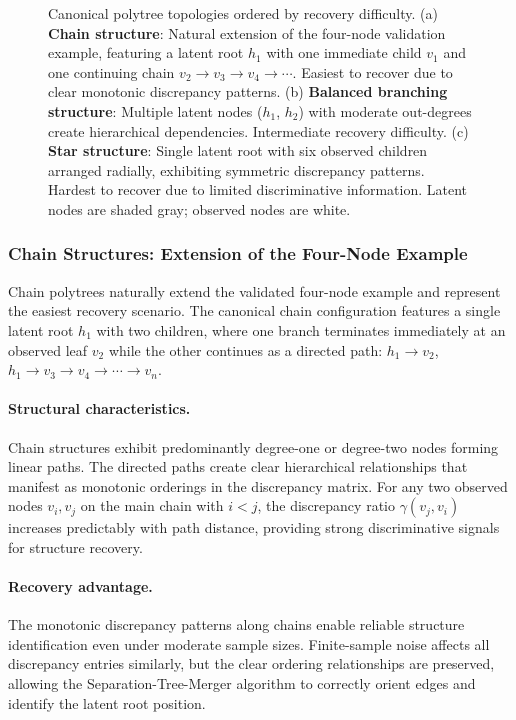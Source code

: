 \documentclass[11pt,a4paper]{article}
\numberwithin{equation}{section}
\begin{document}
\begin{figure}[ht]
\caption{Canonical polytree topologies ordered by recovery difficulty. (a) \textbf{Chain structure}: Natural extension of the four-node validation example, featuring a latent root $h_1$ with one immediate child $v_1$ and one continuing chain $v_2 \to v_3 \to v_4 \to \cdots$. Easiest to recover due to clear monotonic discrepancy patterns. (b) \textbf{Balanced branching structure}: Multiple latent nodes ($h_1$, $h_2$) with moderate out-degrees create hierarchical dependencies. Intermediate recovery difficulty. (c) \textbf{Star structure}: Single latent root with six observed children arranged radially, exhibiting symmetric discrepancy patterns. Hardest to recover due to limited discriminative information. Latent nodes are shaded gray; observed nodes are white.}
\label{fig:topology_examples}
\end{figure}

\subsubsection{Chain Structures: Extension of the Four-Node Example}

Chain polytrees naturally extend the validated four-node example and represent the easiest recovery scenario. The canonical chain configuration features a single latent root $h_1$ with two children, where one branch terminates immediately at an observed leaf $v_2$ while the other continues as a directed path: $h_1 \to v_2$, $h_1 \to v_3 \to v_4 \to \cdots \to v_n$. 

\paragraph{Structural characteristics.} Chain structures exhibit predominantly degree-one or degree-two nodes forming linear paths. The directed paths create clear hierarchical relationships that manifest as monotonic orderings in the discrepancy matrix. For any two observed nodes $v_i, v_j$ on the main chain with $i < j$, the discrepancy ratio $\gamma(v_j, v_i)$ increases predictably with path distance, providing strong discriminative signals for structure recovery.

\paragraph{Recovery advantage.} The monotonic discrepancy patterns along chains enable reliable structure identification even under moderate sample sizes. Finite-sample noise affects all discrepancy entries similarly, but the clear ordering relationships are preserved, allowing the Separation-Tree-Merger algorithm to correctly orient edges and identify the latent root position.
\end{document}
